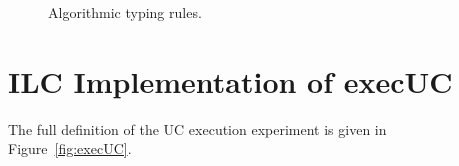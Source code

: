 \begin{figure}[h]

\caption{Algorithmic typing rules.}
\label{fig:alg-type-check}
\end{figure}
\newpage

\twocolumn

\onecolumn
\section{ILC Implementation of \textsf{execUC} }
\label{sec:full-execUC}
The full definition of the UC execution experiment is given in Figure~\ref{fig:execUC}.

